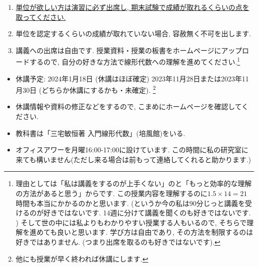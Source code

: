 \documentclass[dvipdfmx,a4paper,11pt]{article}
\theoremstyle{definition}
\begin{document}
\medskip
{}
\begin{enumerate}
  \setlength{\parskip}{0cm} 
  \setlength{\itemsep}{0cm} 
\item \underline{単位が欲しい方は演習に必ず出席し, 期末試験で成績が取れるくらいの点を取ってください.} 
\item 単位を認定するくらいの成績が取れていない場合, 容赦無く不可を出します. 
\item 講義への出席は自由です. 授業資料・授業の板書をホームページにアップロードするので, 自分の好きな方法で線形代数への理解を進めてください.\footnote{理由としては「私は講義をするのが上手くない」のと「もっと効率的な理解の方法があると思う」からです. この授業内容を理解するのに$1.5 \times 14 = 21$時間も本当にかかるのかと思います. (というか今の私は90分じっと講義を受けるのが好きではないです.  14週に分けて講義を聞くのも好きではないです. ) そして世の中には私よりもわかりやすい授業する人もいるので, そちらで理解を進めても良いと思います. 学び方は自由であり, その方法を制限するのは好きではありません. (つまり出席を取るのも好きではないです).}
\end{enumerate}


\vspace{11pt}
\begin{itemize}
  \setlength{\parskip}{0cm} %
  \setlength{\itemsep}{0cm} %
  \item 休講予定: 2024年1月18日 (休講はほぼ確定) 2023年11月28日または2023年11月30日 (どちらか休講にするかも・未確定). \footnote{他にも授業が早く終われば休講にします.} 
  \item 休講情報や資料の修正などをするので, こまめにホームページを確認してください.
  \item 教科書は「三宅敏恒著 入門線形代数」(培風館)をいる.
   \item オフィスアワーを月曜16:00-17:00に設けています. この時間に私の研究室に来ても構いません(ただし来る場合は前もって連絡してくれると助かります.)
 \end{itemize}


\newpage 
\end{document}
